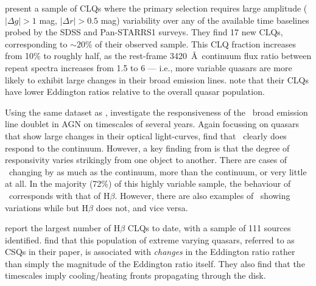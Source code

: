 \documentclass[fleqn,usenatbib]{mnras}
\begin{document}
\citet{MacLeod2019} present a sample of CLQs where the primary
selection requires large amplitude ($| \Delta g | > 1$ mag, $| \Delta
r | > 0.5$ mag) variability over any of the available time baselines
probed by the SDSS and Pan-STARRS1 surveys. They find 17 new CLQs,
corresponding to $\sim 20$\% of their observed sample. This CLQ
fraction increases from 10\% to roughly half, as the rest-frame
3420~\AA\ continuum flux ratio between repeat spectra increases from
1.5 to 6 --- i.e., more variable quasars are more likely to exhibit
large changes in their broad emission lines. \citet{MacLeod2019} note
that their CLQs have lower Eddington ratios relative to the overall
quasar population.

Using the same dataset as \citet{MacLeod2019}, \citet{Homan2020}
investigate the responsiveness of the \mgii\ broad emission line
doublet in AGN on timescales of several years.  Again focussing on
quasars that show large changes in their optical light-curves,
\citet{Homan2020} find that \mgii\ clearly does respond to the
continuum.  However, a key finding from \citet{Homan2020} is that the
degree of responsivity varies strikingly from one object to another.
There are cases of \mgii\ changing by as much as the continuum, more
than the continuum, or very little at all.  In the majority (72\%) of
this highly variable sample, the behaviour of \mgii\ corresponds with
that of H$\beta$.  However, there are also examples of \mgii\ showing
variations while but H$\beta$ does not, and vice versa.

\citet{Graham2020} report the largest number of H$\beta$ CLQs to
date, with a sample of 111 sources identified. \citet{Graham2020}
find that this population of extreme varying quasars, referred to as
CSQs in their paper, is associated with {\it changes} in the Eddington
ratio rather than simply the magnitude of the Eddington ratio itself.
They also find that the timescales imply cooling/heating fronts
propagating through the disk.
\end{document}
